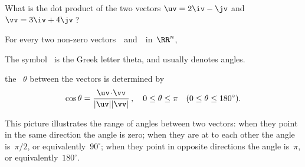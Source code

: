 \begin{activity}
What is the dot product of the two vectors \(\uv=2\iv-\jv\) and \(\vv=3\iv+4\jv\)\,?
\end{activity}





\begin{theorem} \label{thm:anglev}
For every two non-zero vectors~\uv\ and~\vv\ in~\(\RR^n\),  
\begin{aside}
The symbol~\idx{$\theta$} is the Greek letter theta, and usually denotes angles.
\end{aside}%
the ~\(\theta\) between the vectors is determined by 
\begin{equation*}
\cos\theta=\frac{\uv\cdot\vv}{|\uv||\vv|}\,,
\quad 0\leq\theta\leq\pi
\quad (0\leq\theta\leq180^\circ).
\end{equation*}
\end{theorem}

\begin{wrapfigure}{r}{0pt} 
\end{wrapfigure}
This picture illustrates the range of angles between two vectors: when they point in the same direction the angle is zero; when they are at  to each other the angle is~\(\pi/2\), or equivalently~\(90^\circ\); when they point in opposite directions the angle is~\(\pi\), or equivalently~\(180^\circ\).



